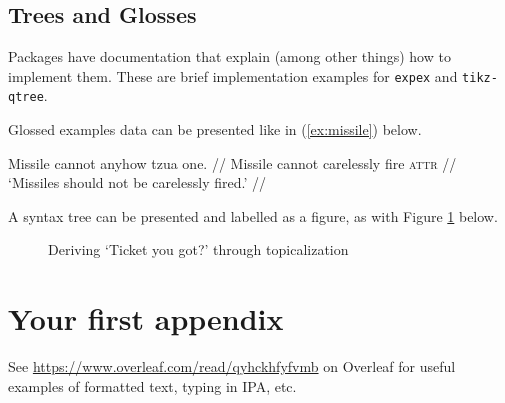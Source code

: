 \documentclass[twoside]{memoir}
\begin{document}
\section{Trees and Glosses}

Packages have documentation that explain (among other things) how to implement them. These are brief implementation examples for \texttt{expex} and \texttt{tikz-qtree}. 

Glossed examples data can be presented like in (\ref{ex:missile}) below.

\ex\label{ex:missile}
\begingl
\gla Missile cannot anyhow tzua one. //
\glb Missile cannot carelessly fire \textsc{attr} //
\glft `Missiles should not be carelessly fired.' //
\endgl
\xe

A syntax tree can be presented and labelled as a figure, as with Figure \ref{fig:ticket-topic} below. 

\begin{figure}[h!]
\caption{Deriving `Ticket you got?' through topicalization}
\centering
{}
\label{fig:ticket-topic}
\end{figure}


\appendix
\chapter{Your first appendix}

See \url{https://www.overleaf.com/read/qyhckhfyfvmb} on Overleaf for useful examples of formatted text, typing in IPA, etc.

\backmatter

\end{document}

